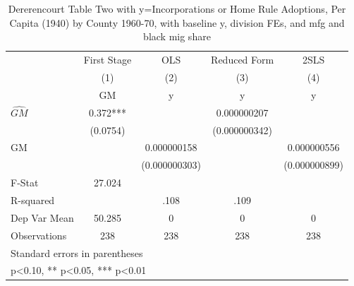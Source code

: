 \begin{table}[htbp]\centering
\def\sym#1{\ifmmode^{#1}\else\(^{#1}\)\fi}
\caption{Dererencourt Table Two with y=Incorporations or Home Rule Adoptions, Per Capita (1940) by County 1960-70, with baseline y, division FEs, and mfg and black mig share}
\begin{tabular}{l*{4}{c}}
\toprule
                    & First Stage   &         OLS   &Reduced Form   &        2SLS   \\
                    &\multicolumn{1}{c}{(1)}&\multicolumn{1}{c}{(2)}&\multicolumn{1}{c}{(3)}&\multicolumn{1}{c}{(4)}\\
                    &\multicolumn{1}{c}{GM}&\multicolumn{1}{c}{y}&\multicolumn{1}{c}{y}&\multicolumn{1}{c}{y}\\
\midrule
$\hat{GM}$          &       0.372***&               & 0.000000207   &               \\
                    &    (0.0754)   &               &(0.000000342)   &               \\
\addlinespace
GM                  &               & 0.000000158   &               & 0.000000556   \\
                    &               &(0.000000303)   &               &(0.000000899)   \\
\midrule
F-Stat              &      27.024   &               &               &               \\
R-squared           &               &        .108   &        .109   &               \\
Dep Var Mean        &      50.285   &           0   &           0   &           0   \\
Observations        &         238   &         238   &         238   &         238   \\
\bottomrule
\multicolumn{5}{l}{\footnotesize Standard errors in parentheses}\\
\multicolumn{5}{l}{\footnotesize * p<0.10, ** p<0.05, *** p<0.01}\\
\end{tabular}
\end{table}
